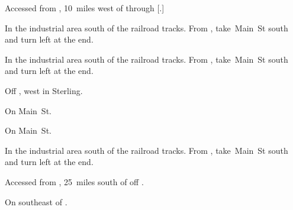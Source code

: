 
\begin{LocationList}

Accessed from , 10~miles west of  through [.]

In the industrial area south of the railroad tracks.
From , take~Main~St south and turn left at the end.

\Location{\GarageHQ \Garage}
In the industrial area south of the railroad tracks.
From , take~Main~St south and turn left at the end.

Off , west in Sterling.

On  Main~St.

On  Main~St.

In the industrial area south of the railroad tracks.
From , take~Main~St south and turn left at the end.

Accessed from , 25~miles south of  off  .

\Location{\TruckStop \Gas \Rest \Weigh}
On  southeast of  .

\end{LocationList}
